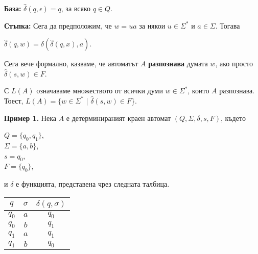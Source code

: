 \documentclass{article}
\begin{document}
    \vspace{5pt}

    \textbf{База:} $\hat{\delta}(q,\epsilon) = q$, за всяко $q \in Q$.

    \vspace{5pt}

    \textbf{Стъпка:} Сега да предположим, че $w = ua$ за някои $u \in \Sigma^*$ и 
    $a \in \Sigma$. Тогава \\
    \begin{center}
        $\hat{\delta}(q,w) = \delta(\hat{\delta}(q,x),a)$.
    \end{center}

    \vspace{5pt}
    Сега вече формално, казваме, че автоматът $A$ \textbf{разпознава} думата $w$, ако просто
    $\hat{\delta}(s,w) \in F$.

    \vspace{5pt}
    С $L(A)$ означаваме множеството от всички думи $w \in \Sigma^*$, които $A$ разпознава.
    Тоест, $L(A) = \{w \in \Sigma^*$ | $\hat{\delta}(s,w) \in F$\}.
    \vspace{10pt}

    \textbf{Пример 1.} Нека $A$ е детерминираният краен автомат $(Q, \Sigma, \delta, s, F)$, където \\
    \begin{center}
        $Q = \{q_0, q_1\}$, \\
        $\Sigma = \{a,b\}$, \\
        $s = q_0$, \\
        $F = \{q_0\}$,
    \end{center}

    и $\delta$ е функцията, представена чрез следната талбица.

    \vspace{5pt} 

    \begin{center}
        \begin{tabular}{ c c c } 
         \hline
         $q$ & $\sigma$ & $\delta(q,\sigma)$ \\
         \hline 
         $q_0$ & $a$ & $q_0$ \\ 
         $q_0$ & $b$ & $q_1$ \\ 
         $q_1$ & $a$ & $q_1$ \\
         $q_1$ & $b$ & $q_0$ \\
         \hline
        \end{tabular}
    \end{center}
\end{document}
